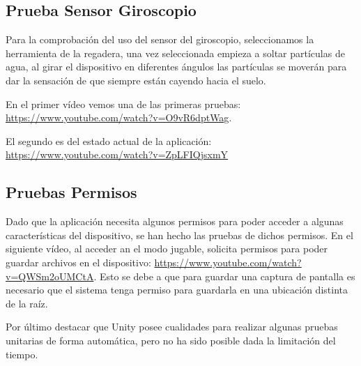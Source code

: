 \subsection{Prueba Sensor Giroscopio}
Para la comprobación del uso del sensor del giroscopio, seleccionamos la herramienta de la regadera, una vez seleccionada empieza a soltar partículas de agua, al girar el dispositivo en diferentes ángulos las partículas se moverán para dar la sensación de que siempre están cayendo hacia el suelo. 

En el primer vídeo vemos una de las primeras pruebas:\\ \url{https://www.youtube.com/watch?v=O9vR6dptWag}.

 El segundo es del estado actual de la aplicación:\\ \url{https://www.youtube.com/watch?v=ZpLFIQjsxmY}

\subsection{Pruebas Permisos}
Dado que la aplicación necesita algunos permisos para poder acceder a algunas características del dispositivo, se han hecho las pruebas de dichos permisos. En el siguiente vídeo, al acceder an el modo jugable, solicita permisos para poder guardar archivos en el dispositivo: \url{https://www.youtube.com/watch?v=QWSm2oUMCtA}. Esto se debe a que para guardar una captura de pantalla es necesario que el sistema tenga permiso para guardarla en una ubicación distinta de la raíz.




Por último destacar que Unity posee cualidades para realizar algunas pruebas unitarias de forma automática, pero no ha sido posible dada la limitación del tiempo.